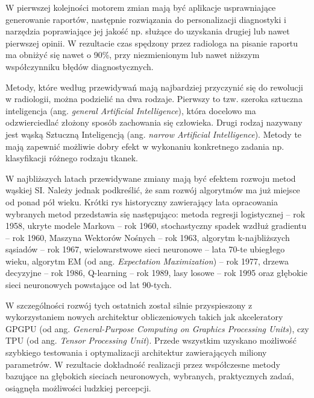 W pierwszej kolejności motorem zmian mają być aplikacje usprawniające generowanie raportów, następnie rozwiązania do personalizacji diagnostyki i narzędzia poprawiające jej jakość np. służące do uzyskania drugiej lub nawet pierwszej opinii. W rezultacie czas spędzony przez radiologa na pisanie raportu ma obniżyć się nawet o 90\%, przy niezmienionym lub nawet niższym współczynniku błędów diagnostycznych.

Metody, które według przewidywań mają najbardziej przyczynić się do rewolucji w radiologii, można podzielić na dwa rodzaje. Pierwszy to tzw. szeroka sztuczna inteligencja (ang. \textit{general Artificial Intelligence}), która docelowo ma odzwierciedlać złożony sposób zachowania się człowieka. Drugi rodzaj nazywany jest wąską Sztuczną Inteligencją (ang. \textit{narrow Artificial Intelligence}). Metody te mają zapewnić możliwie dobry efekt w wykonaniu konkretnego zadania np. klasyfikacji różnego rodzaju tkanek. 

W najbliższych latach przewidywane zmiany mają być efektem rozwoju metod wąskiej SI. Należy jednak podkreślić, że sam rozwój algorytmów ma już miejsce od ponad pół wieku. Krótki rys historyczny zawierający lata opracowania wybranych metod przedstawia się następująco: metoda regresji logistycznej -- rok 1958, ukryte modele Markova -- rok 1960, stochastyczny spadek wzdłuż gradientu -- rok 1960, Maszyna Wektorów Nośnych -- rok 1963, algorytm k-najbliższych sąsiadów -- rok 1967, wielowarstwowe sieci neuronowe -- lata 70-te ubiegłego wieku, algorytm EM (od ang. \textit{Expectation Maximization}) -- rok 1977, drzewa decyzyjne -- rok 1986, Q-learning -- rok 1989, lasy losowe -- rok 1995 oraz głębokie sieci neuronowych powstające od lat 90-tych. 

W szczególności rozwój tych ostatnich został silnie przyspieszony z wykorzystaniem nowych architektur obliczeniowych takich jak akceleratory GPGPU (od ang. \textit{General-Purpose Computing on Graphics Processing Units}), czy TPU (od ang. \textit{Tensor Processing Unit}). Przede wszystkim uzyskano możliwość szybkiego testowania i optymalizacji architektur zawierających miliony parametrów. W rezultacie dokładność realizacji przez współczesne metody bazujące na głębokich sieciach neuronowych, wybranych, praktycznych zadań, osiągnęła możliwości ludzkiej percepcji. 

